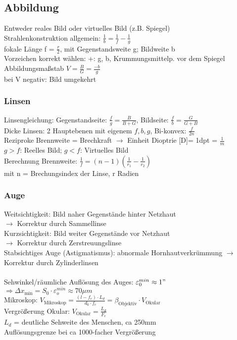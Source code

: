 \documentclass[fs, footer]{latex4ei}
\begin{document}
\begin{multicols*}{4}
\subsection{Abbildung}
Entweder reales Bild oder virtuelles Bild (z.B. Spiegel)\\
Strahlenkonstruktion allgemein: $\frac{1}{b}= \frac{1}{f} - \frac{1}{g}$\\
fokale Länge f = $\frac{r}{2}$, mit Gegenstandsweite g; Bildweite b\\
Vorzeichen korrekt wählen: +: g, b, Krummungsmittelp. vor dem Spiegel\\ %
Abbildungsmaßstab $V = \frac{B}{G}=\frac{-b}{g}$ \\bei V negativ: Bild umgekehrt\\
\subsubsection{Linsen}
Linsengleichung:
Gegenstandseite: $\frac{f}{g} = \frac{B}{B+G}$, 
Bildseite: $\frac{f}{b}= \frac{G}{G+B}$\\
Dicke Linsen: 2 Hauptebenen mit eigenem $f, b, g$, Bi-konvex: $\frac{f}{2n}$\\
Reziproke Brennweite = Brechkraft $\rightarrow$ Einheit Dioptrie [D]= 1dpt = $\frac{1}{m}$\\
$g>f$: Reelles Bild;
$g<f$: Virtuelles Bild\\
Berechnung Brennweite: $\frac{1}{f}=(n-1)(\frac{1}{r_1}-\frac{1}{r_2})$\\
mit n = Brechungsindex der Linse, r Radien
\subsubsection{Auge}
Weitsichtigkeit: Bild naher Gegenstände hinter Netzhaut\\
$\rightarrow$ Korrektur durch Sammellinse\\
Kurzsichtigkeit: Bild weiter Gegenstände vor Netzhaut\\
$\rightarrow$ Korrektur durch Zerstreuungslinse\\
Stabsichtiges Auge (Astigmatismus): abnormale Hornhautverkrümmung $\rightarrow$ Korrektur durch Zylinderlinsen\\
\\Sehwinkel/räumliche Auflösung des Auges: $\varepsilon_0^{min} \approx 1"$\\
$\Rightarrow \Delta x_{\text{min}} = S_0\cdot\varepsilon_o^{min} \approx 70 \mu m$\\
Mikroskop: $V_{\text{Mikroskop}} = \frac{(l-f_e)\cdot L_d}{d_0\cdot f_e} = \beta_{\text{Objektiv}}\cdot V_{\text{Okular}}$\\
Vergrößerung Okular: $V_{\text{Okular}} = \frac{L_d}{F_e}$\\
$L_d$ = deutliche Sehweite des Menschen, ca 250mm\\
Auflösungsgrenze bei ca 1000-facher Vergrößerung\\


\end{multicols*}
\end{document}
